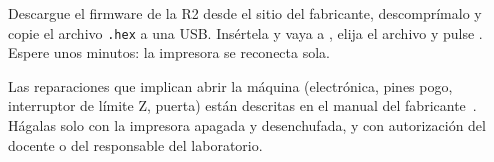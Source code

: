 \begin{infobox}
Descargue el firmware de la R2 desde el sitio del fabricante, descomprímalo y copie el archivo \texttt{.hex} a una USB. Insértela y vaya a \flecha{}\flecha{}, elija el archivo y pulse . Espere unos minutos: la impresora se reconecta sola.
\end{infobox}

\begin{warningbox}
Las reparaciones que implican abrir la máquina (electrónica, pines pogo, interruptor de límite Z, puerta) están descritas en el manual del fabricante~\cite{robomanual}. Hágalas solo con la impresora apagada y desenchufada, y con autorización del docente o del responsable del laboratorio.
\end{warningbox}
